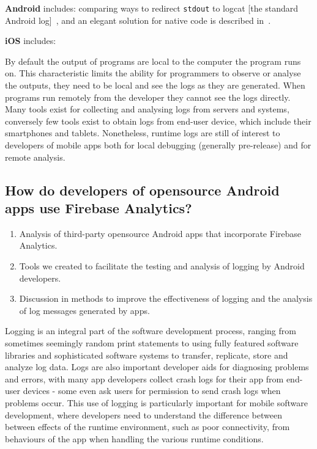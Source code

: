 \textbf{Android} includes: comparing ways to redirect \texttt{stdout} to logcat [the standard Android log]~\citep{krysmanski2012_so_redirect-stdout-to-logcat-in-android-NDK, rcdailey2018_ndk_redirect_to_logcats}, and an elegant solution for native code is described in~\citep{tsiombikas2014_native_NDK_stdio_to_android_log}.

\textbf{iOS} includes: 

By default the output of programs are local to the computer the program runs on. This characteristic limits the ability for programmers to observe or analyse the outputs, they need to be local and see the logs as they are generated. 
%
When programs run remotely from the developer they cannot see the logs directly. Many tools exist for collecting and analysing logs from servers and systems, conversely few tools exist to obtain logs from end-user device, which include their smartphones and tablets. Nonetheless, runtime logs are still of interest to developers of mobile apps both for local debugging (generally pre-release) and for remote analysis.



\subsection{How do developers of opensource Android apps use Firebase Analytics?}
\begin{enumerate}
    \item Analysis of third-party opensource Android apps that incorporate Firebase Analytics.
    \item Tools we created to facilitate the testing and analysis of logging by Android developers.
    \item Discussion in methods to improve the effectiveness of logging and the analysis of log messages generated by apps.
\end{enumerate}

Logging is an integral part of the software development process, ranging from sometimes seemingly random print statements to using fully featured software libraries and sophisticated software systems to transfer, replicate, store and analyze log data. Logs are also important developer aids for diagnosing problems and errors, with many app developers collect crash logs for their app from end-user devices - some even ask users for permission to send crash logs when problems occur.  This use of logging is particularly important for mobile software development, where developers need to understand the difference between between effects of the runtime environment, such as poor connectivity, from behaviours of the app when handling the various runtime conditions.

